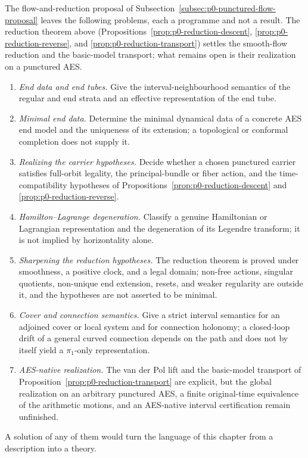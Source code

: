 The flow-and-reduction proposal of
Subsection~\ref{subsec:p0-punctured-flow-proposal} leaves the following problems,
each a programme and not a result.  The reduction theorem above
(Propositions~\ref{prop:p0-reduction-descent}, \ref{prop:p0-reduction-reverse},
and \ref{prop:p0-reduction-transport}) settles the smooth-flow reduction and the
basic-model transport; what remains open is their realization on a punctured AES.

\begin{enumerate}
  \item \label{op:p0-punctured-flow-end-data}\emph{End data and end tubes.}  Give
  the interval-neighbourhood semantics of the regular and end strata and an
  effective representation of the end tube.
  \item \emph{Minimal end data.}  Determine the minimal dynamical data of a
  concrete AES end model and the uniqueness of its extension; a topological or
  conformal completion does not supply it.
  \item \emph{Realizing the carrier hypotheses.}  Decide whether a chosen
  punctured carrier satisfies full-orbit legality, the principal-bundle or fiber
  action, and the time-compatibility hypotheses of
  Propositions~\ref{prop:p0-reduction-descent} and \ref{prop:p0-reduction-reverse}.
  \item \emph{Hamilton--Lagrange degeneration.}  Classify a genuine Hamiltonian or
  Lagrangian representation and the degeneration of its Legendre transform; it is
  not implied by horizontality alone.
  \item \emph{Sharpening the reduction hypotheses.}  The reduction theorem is
  proved under smoothness, a positive clock, and a legal domain; non-free actions,
  singular quotients, non-unique end extension, resets, and weaker regularity are
  outside it, and the hypotheses are not asserted to be minimal.
  \item \emph{Cover and connection semantics.}  Give a strict interval semantics
  for an adjoined cover or local system and for connection holonomy; a closed-loop
  drift of a general curved connection depends on the path and does not by itself
  yield a $\pi_1$-only representation.
  \item \emph{AES-native realization.}  The van der Pol lift and the basic-model
  transport of Proposition~\ref{prop:p0-reduction-transport} are explicit, but the
  global realization on an arbitrary punctured AES, a finite original-time
  equivalence of the arithmetic motions, and an AES-native interval certification
  remain unfinished.
\end{enumerate}

A solution of any of them would turn the language of this chapter from a
description into a theory.
